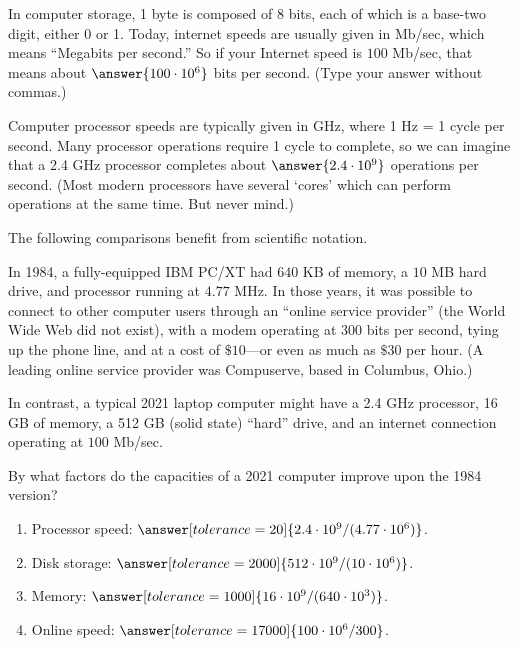 \documentclass[nooutcomes]{ximera}
\begin{document}
\begin{problem}
In computer storage, 1 byte is composed of 8 bits, each of which is a base-two digit, either 0 or 1.  Today, internet speeds are usually given in Mb/sec, which means ``Megabits per second.'' So if your Internet speed is $100$ Mb/sec, 
that means about $\answer{100\cdot10^6}$ bits per second.  (Type your answer without commas.)

Computer processor speeds are typically given in GHz, where 1 Hz = 1 cycle per second.  Many processor operations require 1 cycle to complete, so we can imagine that a 2.4 GHz processor completes about $\answer{2.4\cdot10^9}$ operations per second.  (Most modern processors have several `cores' which can perform operations at the same time.  But never mind.)
\end{problem}

The following comparisons benefit from scientific notation.  
\begin{problem}
In 1984, a fully-equipped IBM PC/XT had $640$ KB of memory, a $10$ MB hard drive, and processor running at $4.77$ MHz.  In those years, it was possible to connect to other computer users through an ``online service provider'' (the World Wide Web did not exist), with a modem operating at 300 bits per second, tying up the phone line, and at a cost of $\$10$---or even as much as $\$30$ per hour.  (A leading online service provider was Compuserve, based in Columbus, Ohio.)  

In contrast, a typical 2021 laptop computer might have a 2.4 GHz processor, 16 GB of memory, a 512 GB (solid state) ``hard'' drive, and an internet connection operating at $100$ Mb/sec.  

By what factors do the capacities of a 2021 computer improve upon the 1984 version?  

\begin{enumerate}
\item Processor speed: $\answer[tolerance=20]{2.4\cdot10^9/(4.77\cdot10^6)}$.  %
\item Disk storage: $\answer[tolerance=2000]{512\cdot10^9/(10\cdot10^6)}$.     %
\item Memory: $\answer[tolerance=1000]{16\cdot10^9/(640\cdot10^3)}$.           %
\item Online speed: $\answer[tolerance=17000]{100\cdot10^6/300}$.              %
\end{enumerate}
\end{problem}
\end{document}
